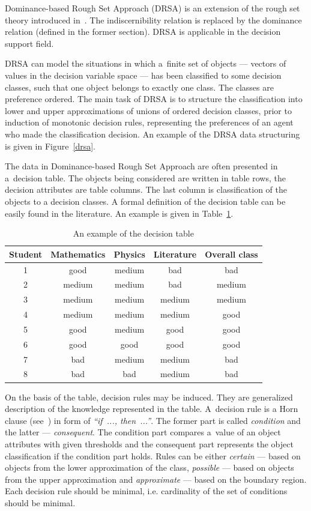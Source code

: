 Dominance-based Rough Set Approach (DRSA) is an extension of the rough set
theory introduced in~\cite{GMS01, GMS02, GMS05}. The indiscernibility relation
is replaced by the dominance relation (defined in the former section). DRSA is
applicable in the decision support field.

DRSA can model the situations in which a~finite set of objects --- vectors of
values in the decision variable space --- has been classified to some decision
classes, such that one object belongs to exactly one class. The classes are
preference ordered. The main task of DRSA is to structure the classification
into lower and upper approximations of unions of ordered decision classes,
prior to induction of monotonic decision rules, representing the preferences
of an agent who made the classification decision. An example of the DRSA data
structuring is given in Figure~\ref{drsa}.

The data in Dominance-based Rough Set Approach are often presented in
a~decision table. The objects being considered are written in table rows, the
decision attributes are table columns. The last column is classification of
the objects to a decision classes. A formal definition of the decision table
can be easily found in the literature. An example is given in
Table~\ref{t:dec_tab-example}.

\begin{table}
  \centering
  \begin{tabular}{c c c c | c}
   \hline
   Student & Mathematics & Physics & Literature & Overall class \\
   \hline
   \hline
   1 & good & medium & bad & bad \\
   2 & medium & medium & bad & medium \\
   3 & medium & medium & medium & medium \\
   4 & medium & medium & medium & good \\
   5 & good & medium & good & good \\
   6 & good & good & good & good \\
   7 & bad & medium & medium & bad \\
   8 & bad & bad & medium & bad \\
   \hline
  \end{tabular}
  \caption{An example of the decision table}
  \label{t:dec_tab-example}
\end{table}

On the basis of the table, decision rules may be induced. They are generalized
description of the knowledge represented in the table. A~decision rule is a
Horn clause (see~\cite{Hor51}) in form of \textit{``if~..., then~...''}. The
former part is called \textit{condition} and the latter ---
\textit{consequent}. The condition part compares a~value of an object
attributes with given thresholds and the consequent part represents the object
classification if the condition part holds. Rules can be either
\textit{certain} --- based on objects from the lower approximation of the
class, \textit{possible} --- based on objects from the upper approximation and
\textit{approximate} --- based on the boundary region. Each decision rule
should be minimal, i.e. cardinality of the set of conditions should be
minimal.

